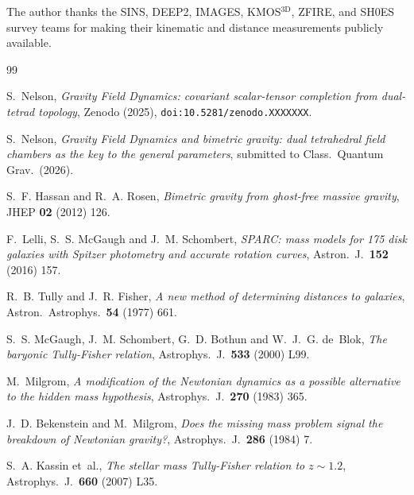 \documentclass[a4paper,11pt]{article}
\begin{document}
\acknowledgments

The author thanks the SINS, DEEP2, IMAGES, KMOS$^{\mathrm{3D}}$, ZFIRE, and SH0ES survey teams for making their kinematic and distance measurements publicly available.

\begin{thebibliography}{99}

S.~Nelson,
\emph{Gravity Field Dynamics: covariant scalar-tensor completion from dual-tetrad topology},
Zenodo (2025),
\texttt{doi:10.5281/zenodo.XXXXXXX}.

S.~Nelson,
\emph{Gravity Field Dynamics and bimetric gravity: dual tetrahedral field chambers as the key to the general parameters},
submitted to Class.\ Quantum Grav.\ (2026).

S.~F. Hassan and R.~A. Rosen,
\emph{Bimetric gravity from ghost-free massive gravity},
JHEP \textbf{02} (2012) 126.

F.~Lelli, S.~S. McGaugh and J.~M. Schombert,
\emph{SPARC: mass models for 175 disk galaxies with Spitzer photometry and accurate rotation curves},
Astron.\ J.\ \textbf{152} (2016) 157.

R.~B. Tully and J.~R. Fisher,
\emph{A new method of determining distances to galaxies},
Astron.\ Astrophys.\ \textbf{54} (1977) 661.

S.~S. McGaugh, J.~M. Schombert, G.~D. Bothun and W.~J.~G. de~Blok,
\emph{The baryonic Tully-Fisher relation},
Astrophys.\ J.\ \textbf{533} (2000) L99.

M.~Milgrom,
\emph{A modification of the Newtonian dynamics as a possible alternative to the hidden mass hypothesis},
Astrophys.\ J.\ \textbf{270} (1983) 365.

J.~D. Bekenstein and M.~Milgrom,
\emph{Does the missing mass problem signal the breakdown of Newtonian gravity?},
Astrophys.\ J.\ \textbf{286} (1984) 7.

S.~A. Kassin et~al.,
\emph{The stellar mass Tully-Fisher relation to $z \sim 1.2$},
Astrophys.\ J.\ \textbf{660} (2007) L35.


\end{thebibliography}
\end{document}
